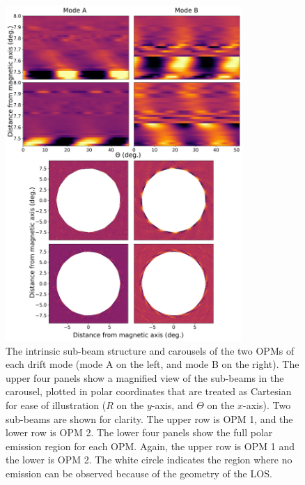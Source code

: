 \begin{figure}
    \begin{center}
        \includegraphics[width=0.8\textwidth]{Figures/B0031/canres_sparks_2}
        \caption[Sub-beams and carousels of the canonical model]{The intrinsic sub-beam structure and carousels of the two OPMs of each drift mode (mode A on the left, and mode B on the right). The upper four panels show a magnified view of the sub-beams in the carousel, plotted in polar coordinates that are treated as Cartesian for ease of illustration ($R$ on the $y$-axis, and $\Theta$ on the $x$-axis). Two sub-beams are shown for clarity. The upper row is OPM 1, and the lower row is OPM 2. The lower four panels show the full polar emission region for each OPM. Again, the upper row is OPM 1 and the lower is OPM 2. The white circle indicates the region where no emission can be observed because of the geometry of the LOS.}
        \label{fig: B0031 - canonical model sparks and carousels}
    \end{center}
\end{figure}

